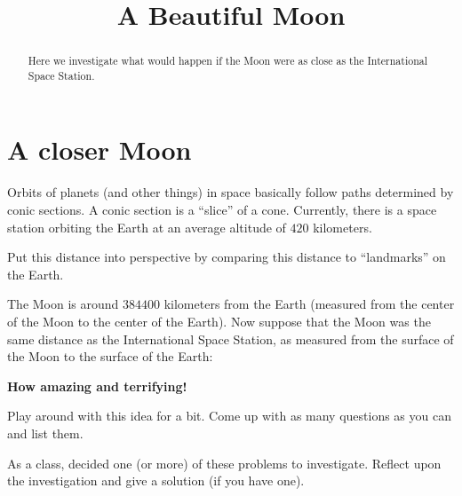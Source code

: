 \documentclass{ximera}
\title{A Beautiful Moon}
\begin{document}
\begin{abstract}
Here we investigate what would happen if the Moon were as close as the
International Space Station.
\end{abstract}
\maketitle

\section{A closer Moon}

Orbits of planets (and other things) in space basically follow paths
determined by conic sections. A conic section is a ``slice'' of a
cone. Currently, there is a space station orbiting the Earth at an average
altitude of $420$ kilometers.

\begin{problem}
Put this distance into perspective by comparing this distance to
``landmarks'' on the Earth.
\begin{freeResponse}
\end{freeResponse}
\end{problem}

The Moon is around $384400$ kilometers from the Earth (measured from
the center of the Moon to the center of the Earth). Now suppose that
the Moon was the same distance as the International Space Station, as
measured from the surface of the Moon to the surface of the Earth:

\begin{center}
\textbf{How amazing and terrifying!}
\end{center}

\break

\begin{problem}
Play around with this idea for a bit. Come up with as many questions
as you can and list them.
\begin{freeResponse}
\end{freeResponse}
\end{problem}

\begin{problem}
As a class, decided one (or more) of these problems to
investigate. Reflect upon the investigation and give a solution (if
you have one).
\begin{freeResponse}
\end{freeResponse}
\end{problem}
\end{document}
